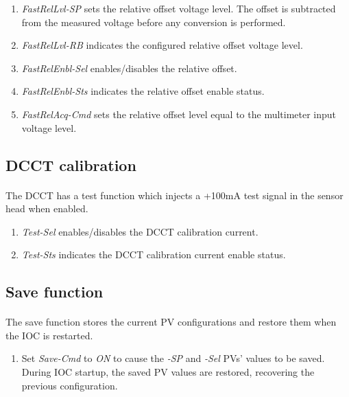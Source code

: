 \documentclass[openany]{article}
\begin{document}
			\noindent{}

			\begin{enumerate}
				\item \emph{FastRelLvl-SP} sets the relative offset voltage level. The offset is subtracted from the measured voltage before any conversion is performed.
				\item \emph{FastRelLvl-RB} indicates the configured relative offset voltage level.
				\item \emph{FastRelEnbl-Sel} enables/disables the relative offset.
				\item \emph{FastRelEnbl-Sts} indicates the relative offset enable status.
				\item \emph{FastRelAcq-Cmd} sets the relative offset level equal to the multimeter input voltage level.
			\end{enumerate}

	\subsection{DCCT calibration}

		\paragraph{} The DCCT has a test function which injects a +100mA test signal in the sensor head when enabled.

			\begin{enumerate}
				\item \emph{Test-Sel} enables/disables the DCCT calibration current.
				\item \emph{Test-Sts} indicates the DCCT calibration current enable status.
			\end{enumerate}

	\subsection{Save function}

		\paragraph{} The save function stores the current PV configurations and restore them when the IOC is restarted.

			\begin{enumerate}
				\item Set \emph{Save-Cmd} to \emph{ON} to cause the \emph{-SP} and \emph{-Sel} PVs' values to be saved. During IOC startup, the saved PV values are restored, recovering the previous configuration.
			\end{enumerate}
\end{document}
